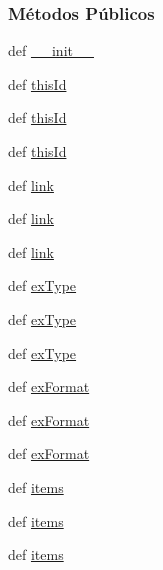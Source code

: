 \subsubsection*{Métodos Públicos}
\begin{DoxyCompactItemize}
\item 
def \hyperlink{classELO_1_1EntityUnit_1_1Exercise_a8e29c352a46fe192f7737bfa96d0e176}{\-\_\-\-\_\-init\-\_\-\-\_\-}
\item 
def \hyperlink{classELO_1_1EntityUnit_1_1Exercise_a16ee1a43f22c4d9f99f2a98fa02c016b}{this\-Id}
\item 
def \hyperlink{classELO_1_1EntityUnit_1_1Exercise_a16ee1a43f22c4d9f99f2a98fa02c016b}{this\-Id}
\item 
def \hyperlink{classELO_1_1EntityUnit_1_1Exercise_a16ee1a43f22c4d9f99f2a98fa02c016b}{this\-Id}
\item 
def \hyperlink{classELO_1_1EntityUnit_1_1Exercise_a9a140c7c2c9e4b90d1f40acfed62efd0}{link}
\item 
def \hyperlink{classELO_1_1EntityUnit_1_1Exercise_a9a140c7c2c9e4b90d1f40acfed62efd0}{link}
\item 
def \hyperlink{classELO_1_1EntityUnit_1_1Exercise_a9a140c7c2c9e4b90d1f40acfed62efd0}{link}
\item 
def \hyperlink{classELO_1_1EntityUnit_1_1Exercise_aee62dc52d043fce780716fb395d88131}{ex\-Type}
\item 
def \hyperlink{classELO_1_1EntityUnit_1_1Exercise_aee62dc52d043fce780716fb395d88131}{ex\-Type}
\item 
def \hyperlink{classELO_1_1EntityUnit_1_1Exercise_aee62dc52d043fce780716fb395d88131}{ex\-Type}
\item 
def \hyperlink{classELO_1_1EntityUnit_1_1Exercise_a5c495ffe5e6e424c1e4754dd07c06bc7}{ex\-Format}
\item 
def \hyperlink{classELO_1_1EntityUnit_1_1Exercise_a5c495ffe5e6e424c1e4754dd07c06bc7}{ex\-Format}
\item 
def \hyperlink{classELO_1_1EntityUnit_1_1Exercise_a5c495ffe5e6e424c1e4754dd07c06bc7}{ex\-Format}
\item 
def \hyperlink{classELO_1_1EntityUnit_1_1Exercise_a7e95e4287551ac552687fa5d0acb6305}{items}
\item 
def \hyperlink{classELO_1_1EntityUnit_1_1Exercise_a7e95e4287551ac552687fa5d0acb6305}{items}
\item 
def \hyperlink{classELO_1_1EntityUnit_1_1Exercise_a7e95e4287551ac552687fa5d0acb6305}{items}
\end{DoxyCompactItemize}
